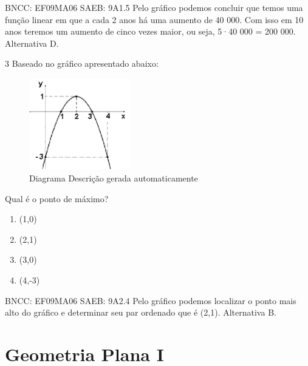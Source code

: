 \begin{escolha}
{{{\begin{escolha}
{BNCC: EF09MA06 SAEB: 9A1.5 Pelo gráfico podemos concluir que temos uma
função linear em que a cada 2 anos há uma aumento de 40 000. Com isso em
10 anos teremos um aumento de cinco vezes maior, ou seja, 5·40 000 = 200
000. Alternativa D.

\num{3} Baseado no gráfico apresentado abaixo:

\begin{figure}
\centering
\includegraphics[width=1.72515in,height=1.5668in]{./_SAEB_9_MAT/media/image156.png}
\caption{Diagrama Descrição gerada automaticamente}
\end{figure}

Qual é o ponto de máximo?

\begin{enumerate}

\item
  (1,0)
\item
  (2,1)
\item
  (3,0)
\item
  (4,-3)
\end{enumerate}

BNCC: EF09MA06 SAEB: 9A2.4 Pelo gráfico podemos localizar o ponto mais
alto do gráfico e determinar seu par ordenado que é (2,1). Alternativa
B.

\pagestyle{mat}
\chapter{Geometria Plana I}


\begin{itemize}


\end{itemize}}
\end{escolha}}}}
\end{escolha}
